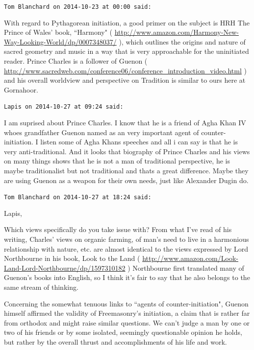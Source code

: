 \begin{footnotesize}\begin{sffamily}



\texttt{Tom Blanchard on 2014-10-23 at 00:00 said: }

With regard to Pythagorean initiation, a good primer on the subject is HRH The Prince of Wales' book, ``Harmony" ( \url{http://www.amazon.com/Harmony-New-Way-Looking-World/dp/0007348037/} ), which outlines the origins and nature of sacred geometry and music in a way that is very approachable for the uninitiated reader. Prince Charles is a follower of Guenon ( \url{http://www.sacredweb.com/conference06/conference\_introduction\_video.html} ) and his overall worldview and perspective on Tradition is similar to ours here at Gornahoor.


\hfill

\texttt{Lapis on 2014-10-27 at 09:24 said: }

I am suprised about Prince Charles. I know that he is a friend of Agha Khan IV whoes grandfather Guenon named as an very important agent of counter-initiation. I listen some of Agha Khans speeches and all i can say is that he is very anti-traditional. And it looks that biography of Prince Charles and his views on many things shows that he is not a man of traditional perspective, he is maybe traditionalist but not traditional and thats a great difference. Maybe they are using Guenon as a weapon for their own needs, just like Alexander Dugin do.


\hfill

\texttt{Tom Blanchard on 2014-10-27 at 18:24 said: }

Lapis,

Which views specifically do you take issue with? From what I've read of his writing, Charles' views on organic farming, of man's need to live in a harmonious relationship with nature, etc. are almost identical to the views expressed by Lord Northbourne in his book, Look to the Land ( \url{http://www.amazon.com/Look-Land-Lord-Northbourne/dp/1597310182} ) Northbourne first translated many of Guenon's books into English, so I think it's fair to say that he also belongs to the same stream of thinking.

Concerning the somewhat tenuous links to ``agents of counter-initiation", Guenon himself affirmed the validity of Freemasonry's initiation, a claim that is rather far from orthodox and might raise similar questions. We can't judge a man by one or two of his friends or by some isolated, seemingly questionable opinion he holds, but rather by the overall thrust and accomplishments of his life and work.



\end{sffamily}
\end{footnotesize}

